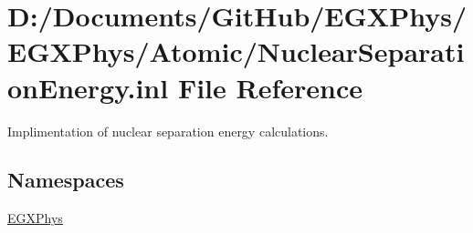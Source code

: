 \hypertarget{_nuclear_separation_energy_8inl}{}\section{D\+:/\+Documents/\+Git\+Hub/\+E\+G\+X\+Phys/\+E\+G\+X\+Phys/\+Atomic/\+Nuclear\+Separation\+Energy.inl File Reference}
\label{_nuclear_separation_energy_8inl}


Implimentation of nuclear separation energy calculations.  


\subsection*{Namespaces}
\begin{DoxyCompactItemize}
\item 
 \hyperlink{namespace_e_g_x_phys}{E\+G\+X\+Phys}
\end{DoxyCompactItemize}
